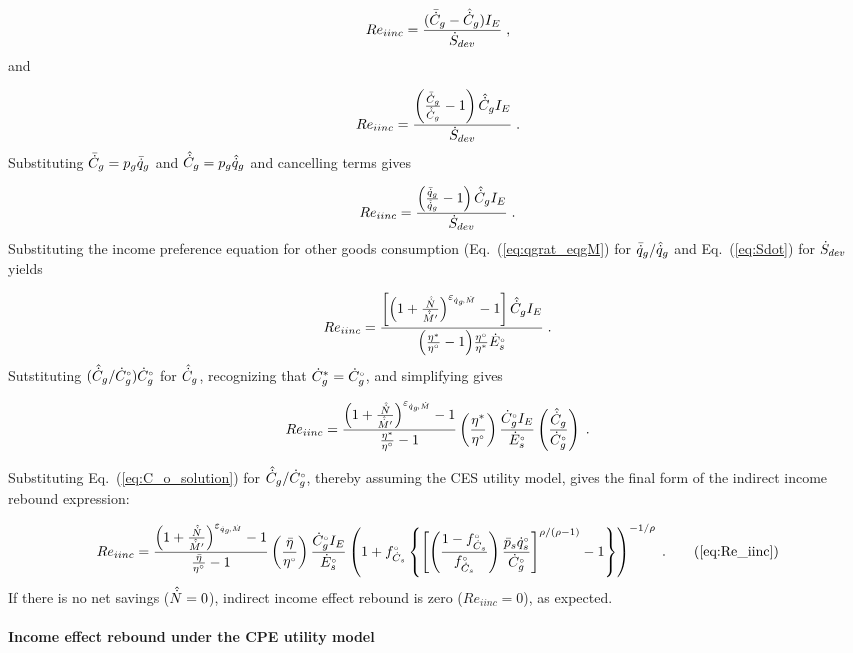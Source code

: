 \begin{equation}
  Re_{iinc} = \frac{(\bar{\dot{C}}_g - \hat{\dot{C}}_g) I_E}{\dot{S}_{dev}} \; ,
\end{equation}
%
and

\begin{equation}
  Re_{iinc} = \frac{\left( \frac{\bar{\dot{C}}_g}{\hat{\dot{C}}_g} - 1  \right) \hat{\dot{C}}_g I_E}{\dot{S}_{dev}} \; .
\end{equation}
%
Substituting $\bar{\dot{C}}_g = p_g \bar{\dot{q}}_g$ and $\hat{\dot{C}}_g = p_g \hat{\dot{q}}_g$ and
cancelling terms gives

\begin{equation}
  Re_{iinc} = \frac{\left( \frac{\bar{\dot{q}}_g}{\hat{\dot{q}}_g} - 1  \right) \hat{\dot{C}}_g I_E}{\dot{S}_{dev}} \; .
\end{equation}
%
Substituting the income preference equation for other goods consumption (Eq.~(\ref{eq:qgrat_eqgM})
for $\bar{\dot{q}}_g / \hat{\dot{q}}_g$
and Eq.~(\ref{eq:Sdot}) for $\dot{S}_{dev}$ yields

\begin{equation}
  Re_{iinc} = \frac{\left[ \left( 1 + \frac{\hat{\dot{N}}}{\hat{\dot{M}}^\prime} \right)^{\varepsilon_{\dot{q}_g\!,\dot{M}}} - 1  \right]
              \hat{\dot{C}}_g I_E}{\left( \frac{{\eta}^*}{{}{\eta}^{\scriptscriptstyle \circ}} - 1 \right)\! \frac{{}{\eta}^{\scriptscriptstyle \circ}}{{\eta}^*} {}{\dot{E}}^{\scriptscriptstyle \circ}_s} \; .
\end{equation}
%
Sutstituting $(\hat{\dot{C}}_g/{}{\dot{C}}^{\scriptscriptstyle \circ}_g) {}{\dot{C}}^{\scriptscriptstyle \circ}_g$ for $\hat{\dot{C}}_g$,
recognizing that ${\dot{C}}^*_g = {}{\dot{C}}^{\scriptscriptstyle \circ}_g$, and simplifying gives

\begin{equation}
  Re_{iinc} = \frac{\left( 1 + \frac{\hat{\dot{N}}}{\hat{\dot{M}}^\prime} \right)^{\varepsilon_{\dot{q}_g\!,\dot{M}}} - 1}{\frac{{\eta}^*}{{}{\eta}^{\scriptscriptstyle \circ}} - 1}
              \left( \frac{{\eta}^*}{{}{\eta}^{\scriptscriptstyle \circ}} \right)
              \frac{{}{\dot{C}}^{\scriptscriptstyle \circ}_g I_E}{{}{\dot{E}}^{\scriptscriptstyle \circ}_s}
              \left( \frac{\hat{\dot{C}}_g}{{}{\dot{C}}^{\scriptscriptstyle \circ}_g} \right) \; .
\end{equation}

Substituting Eq.~(\ref{eq:C_o_solution})
for $\hat{\dot{C}}_g / {}{\dot{C}}^{\scriptscriptstyle \circ}_g$,
thereby assuming the CES utility model,
gives the final form
of the indirect income rebound expression:

\begin{equation}
  Re_{iinc} = \Reiinceqnexact{} \; . \tag{\ref{eq:Re_iinc}}
\end{equation}
%
If there is no net savings ($\hat{\dot{N}} = 0$),
indirect income effect rebound is zero ($Re_{iinc} = 0$), as expected.


\paragraph{Income effect rebound under the CPE utility model}
\label{sec:income_effect_CPE}

